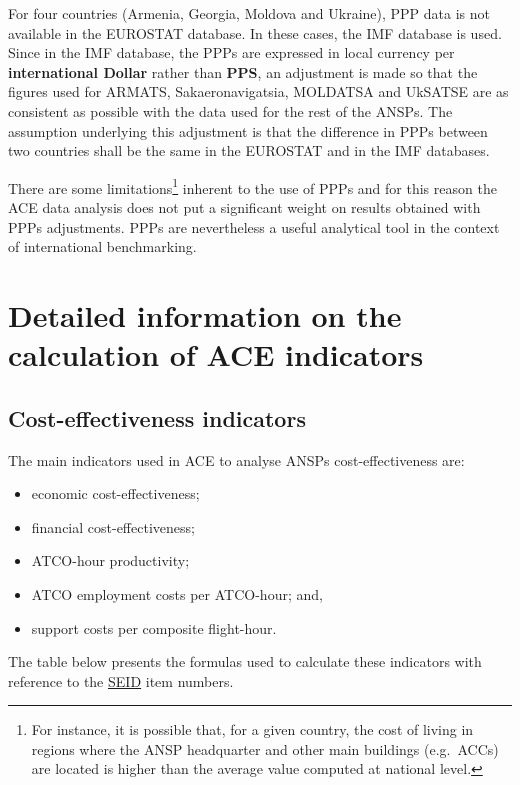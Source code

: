 \documentclass[
  11pt,
  a4paperpaper,
  openany,headsepline=on,footsepline=off,DIV=12,table]{scrbook}
\begin{document}
For four countries (Armenia, Georgia, Moldova and Ukraine), PPP data is
not available in the EUROSTAT database. In these cases, the IMF database
is used. Since in the IMF database, the PPPs are expressed in local
currency per \textbf{international Dollar} rather than \textbf{PPS}, an
adjustment is made so that the figures used for ARMATS,
Sakaeronavigatsia, MOLDATSA and UkSATSE are as consistent as possible
with the data used for the rest of the ANSPs. The assumption underlying
this adjustment is that the difference in PPPs between two countries
shall be the same in the EUROSTAT and in the IMF databases.

There are some limitations\footnote{For instance, it is possible that,
  for a given country, the cost of living in regions where the ANSP
  headquarter and other main buildings (e.g.~ACCs) are located is higher
  than the average value computed at national level.} inherent to the
use of PPPs and for this reason the ACE data analysis does not put a
significant weight on results obtained with PPPs adjustments. PPPs are
nevertheless a useful analytical tool in the context of international
benchmarking.


\chapter{Detailed information on the calculation of ACE
indicators}\label{detailed-information-on-the-calculation-of-ace-indicators}

\section{Cost-effectiveness
indicators}\label{cost-effectiveness-indicators}

The main indicators used in ACE to analyse ANSPs cost-effectiveness are:

\begin{itemize}
\item
  economic cost-effectiveness;
\item
  financial cost-effectiveness;
\item
  ATCO-hour productivity;
\item
  ATCO employment costs per ATCO-hour; and,
\item
  support costs per composite flight-hour.
\end{itemize}

The table below presents the formulas used to calculate these indicators
with reference to the
\href{https://www.eurocontrol.int/publication/eurocontrol-specification-economic-information-disclosure}{SEID}
item numbers.
\end{document}
